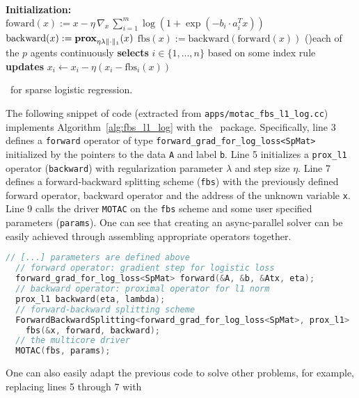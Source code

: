 \begin{algorithm}[H]\label{alg:fbs_l1_log}
\DontPrintSemicolon
  \textbf{Initialization:} \\
  \quad $\text{foward}(x) := x - \eta \, \nabla_x \,\sum_{i = 1}^m \log (1 + \exp(-b_i \cdot a_i^T x))$  
  \quad $\text{backward}(x) := \mathbf{prox}_{\eta \lambda  \|\cdot\|_1} (x)$ 
  \quad $\text{fbs}(x) := \text{backward}(\text{forward}(x))$ 
  \While(){each of the $p$ agents continuously}{
    \textbf{selects} $i \in \{1, ..., n\}$ based on some index rule \;
    \textbf{updates} $x_i \gets x_i - \eta \left(x_i - \text{fbs}_i (x)\right)$ 
  }
  \caption{\pkg~for sparse logistic regression.}
\end{algorithm}
The following snippet of code (extracted from 
\texttt{apps/motac\_fbs\_l1\_log.cc}) implements Algorithm~\ref{alg:fbs_l1_log} with the \pkg~package. 
Specifically, line 3 defines a \texttt{forward} operator of type \texttt{forward\_grad\_for\_log\_loss<SpMat>} 
initialized by the pointers to the data \texttt{A} and label \texttt{b}. Line 5  initializes a 
\texttt{prox\_l1} operator (\texttt{backward}) with regularization parameter $\lambda$ and step size $\eta$. 
Line 7 defines a forward-backward splitting scheme (\texttt{fbs}) with the previously defined forward operator, 
backward operator and the address of the unknown variable \texttt{x}. Line 9 calls the driver 
\texttt{MOTAC} on the \texttt{fbs} scheme and some user specified parameters (\texttt{params}). One can see
that creating an async-parallel solver can be easily achieved through assembling appropriate operators together.  
\begin{lstlisting}[language=C++]
  // [...] parameters are defined above
  // forward operator: gradient step for logistic loss
  forward_grad_for_log_loss<SpMat> forward(&A, &b, &Atx, eta);
  // backward operator: proximal operator for l1 norm 
  prox_l1 backward(eta, lambda);
  // forward-backward splitting scheme
  ForwardBackwardSplitting<forward_grad_for_log_loss<SpMat>, prox_l1>
    fbs(&x, forward, backward);  
  // the multicore driver
  MOTAC(fbs, params);  
\end{lstlisting}
One can also easily adapt the previous code to solve other problems, for example, replacing lines 5 through 7 with
